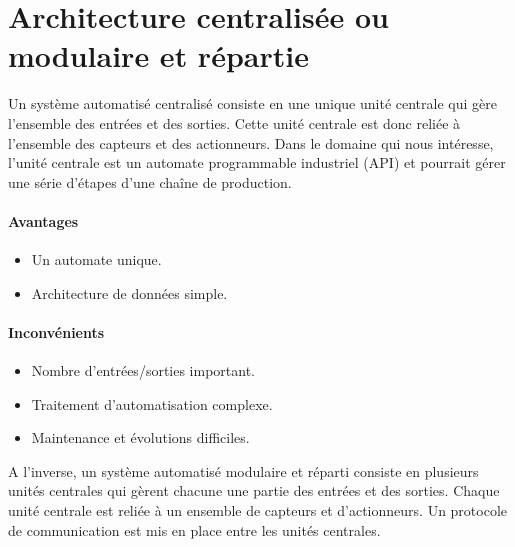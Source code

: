 \section{Architecture centralisée ou modulaire et répartie}
\label{sec:architecture}
Un système automatisé centralisé consiste en une unique unité centrale qui gère l'ensemble des entrées et des sorties. Cette unité centrale est donc reliée à l'ensemble des capteurs et des actionneurs.
Dans le domaine qui nous intéresse, l'unité centrale est un automate programmable industriel (API) et pourrait gérer une série d'étapes d'une chaîne de production. 

\begin{minipage}{0.45\linewidth}
    \paragraph{Avantages}
    \begin{itemize}
        \item Un automate unique.
        \item Architecture de données simple.
    \end{itemize}
\end{minipage}%
%
\begin{minipage}{0.45\linewidth}
    \paragraph{Inconvénients}
    \begin{itemize}
        \item Nombre d'entrées/sorties important.
        \item Traitement d'automatisation complexe.
        \item Maintenance et évolutions difficiles.
    \end{itemize}
\end{minipage}

A l'inverse, un système automatisé modulaire et réparti consiste en plusieurs unités centrales qui gèrent chacune une partie des entrées et des sorties. Chaque unité centrale est reliée à un ensemble de capteurs et d'actionneurs. Un protocole de communication est mis en place entre les unités centrales. 

